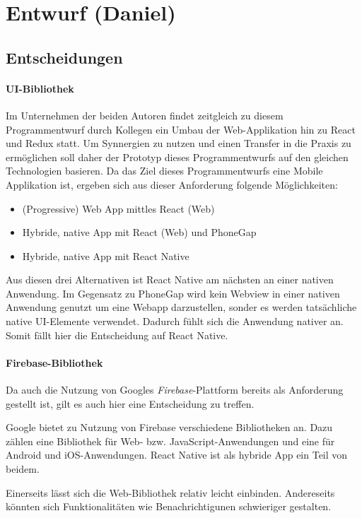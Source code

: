 \section{Entwurf (Daniel)}\label{sec:entwurf}

\subsection{Entscheidungen}
\paragraph{UI-Bibliothek}
Im Unternehmen der beiden Autoren findet zeitgleich zu diesem Programmentwurf durch Kollegen ein Umbau der Web-Applikation hin zu React und Redux statt.
Um Synnergien zu nutzen und einen Transfer in die Praxis zu ermöglichen soll daher der Prototyp dieses Programmentwurfs auf den gleichen Technologien basieren.
Da das Ziel dieses Programmentwurfs eine Mobile Applikation ist, ergeben sich aus dieser Anforderung folgende Möglichkeiten:
\begin{itemize}
    \item (Progressive) Web App mittles React (Web)
    \item Hybride, native App mit React (Web) und PhoneGap
    \item Hybride, native App mit React Native
\end{itemize}

Aus diesen drei Alternativen ist React Native am nächsten an einer nativen Anwendung.
Im Gegensatz zu PhoneGap wird kein Webview in einer nativen Anwendung genutzt um eine Webapp darzustellen,
sonder es werden tatsächliche native UI-Elemente verwendet.
Dadurch fühlt sich die Anwendung nativer an.
Somit fällt hier die Entscheidung auf React Native.

\paragraph{Firebase-Bibliothek}
Da auch die Nutzung von Googles \textit{Firebase}-Plattform bereits als Anforderung gestellt ist,
gilt es auch hier eine Entscheidung zu treffen.

Google bietet zu Nutzung von Firebase verschiedene Bibliotheken an.
Dazu zählen eine Bibliothek für Web- bzw. JavaScript-Anwendungen und eine für Android und iOS-Anwendungen.
React Native ist als hybride App ein Teil von beidem.

Einerseits lässt sich die Web-Bibliothek relativ leicht einbinden.
Andereseits könnten sich Funktionalitäten wie Benachrichtigunen schwieriger gestalten.

